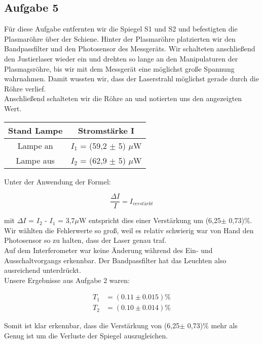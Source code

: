 \subsection{Aufgabe 5}

Für diese Aufgabe entfernten wir die Spiegel S1 und S2 und befestigten die Plasmaröhre über der Schiene. Hinter der Plasmaröhre platzierten wir den Bandpassfilter und den Photosensor des Messgeräts. Wir schalteten anschließend den Justierlaser wieder ein und drehten so lange an den Manipulaturen der Plasmagsröhre, bis wir mit dem Messgerät eine möglichst große Spannung wahrnahmen. Damit wussten wir, dass der Laserstrahl möglichst gerade durch die Röhre verlief.\\
Anschließend schalteten wir die Röhre an und notierten uns den angezeigten Wert.\\

\begin{center}
\begin{tabular}{c | c}
Stand Lampe & Stromstärke I\\
\hline
Lampe an & $I_1$ = (59,2 $\pm$ 5) $\mu$W\\
Lampe aus & $I_2$ = (62,9 $\pm$ 5) $\mu$W

\end{tabular}
\end{center}

Unter der Anwendung der Formel:

\begin{equation}
\frac{\Delta I}{I} = I_{verstärkt}
\end{equation}

mit $\Delta I$ = $I_2$ - $I_1$ = 3,7$\mu$W entspricht dies einer Verstärkung um (6,25$\pm$ 0,73)$\%$. Wir wählten die Fehlerwerte so groß, weil es relativ schwierig war von Hand den Photosensor so zu halten, dass der Laser genau traf.\\
Auf dem Interferometer war keine Änderung während des Ein- und Ausschaltvorgangs erkennbar. Der Bandpassfilter hat das Leuchten also ausreichend unterdrückt.\\
Unsere Ergebnisse aus Aufgabe 2 waren:

\begin{align*}
	T_{1} &= (0.11 \pm 0.015)\% \\
	T_{2} &= (0.10 \pm 0.014)\% 
\end{align*}

Somit ist klar erkennbar, dass die Verstärkung von (6,25$\pm$ 0,73)$\%$ mehr als Genug ist um die Verluste der Spiegel auszugleichen. 